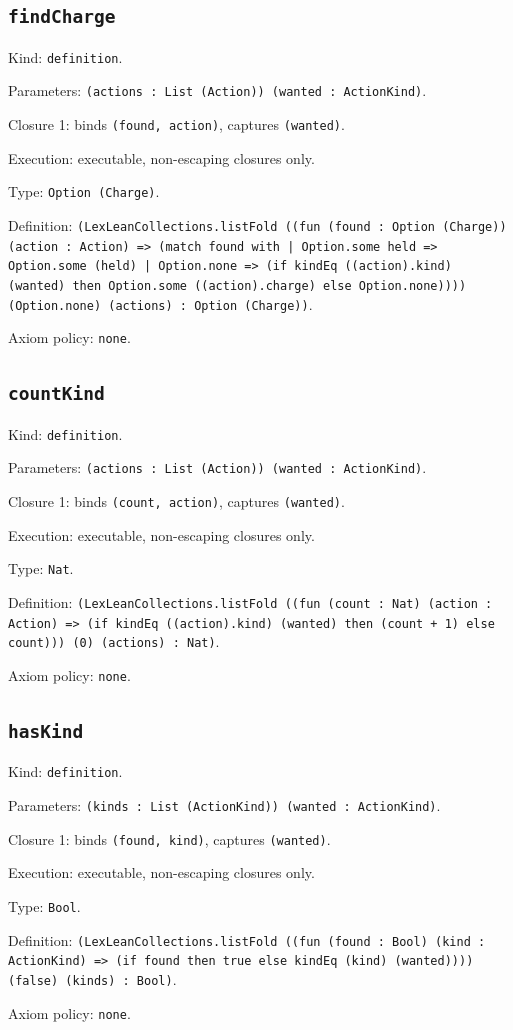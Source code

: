 \documentclass[11pt]{article}
\begin{document}
\subsection*{\texttt{findCharge}}
\noindent Kind: \texttt{definition}.\par
\noindent Parameters: \texttt{(actions : List (Action)) (wanted : ActionKind)}.\par
\noindent Closure 1: binds \texttt{(found, action)}, captures \texttt{(wanted)}.\par
\noindent Execution: executable, non-escaping closures only.\par
\noindent Type: \texttt{Option (Charge)}.\par
\noindent Definition: \texttt{(LexLeanCollections.listFold ((fun (found : Option (Charge)) (action : Action) => (match found with | Option.some held => Option.some (held) | Option.none => (if kindEq ((action).kind) (wanted) then Option.some ((action).charge) else Option.none)))) (Option.none) (actions) : Option (Charge))}.\par
\noindent Axiom policy: \texttt{none}.\par
\subsection*{\texttt{countKind}}
\noindent Kind: \texttt{definition}.\par
\noindent Parameters: \texttt{(actions : List (Action)) (wanted : ActionKind)}.\par
\noindent Closure 1: binds \texttt{(count, action)}, captures \texttt{(wanted)}.\par
\noindent Execution: executable, non-escaping closures only.\par
\noindent Type: \texttt{Nat}.\par
\noindent Definition: \texttt{(LexLeanCollections.listFold ((fun (count : Nat) (action : Action) => (if kindEq ((action).kind) (wanted) then (count + 1) else count))) (0) (actions) : Nat)}.\par
\noindent Axiom policy: \texttt{none}.\par
\subsection*{\texttt{hasKind}}
\noindent Kind: \texttt{definition}.\par
\noindent Parameters: \texttt{(kinds : List (ActionKind)) (wanted : ActionKind)}.\par
\noindent Closure 1: binds \texttt{(found, kind)}, captures \texttt{(wanted)}.\par
\noindent Execution: executable, non-escaping closures only.\par
\noindent Type: \texttt{Bool}.\par
\noindent Definition: \texttt{(LexLeanCollections.listFold ((fun (found : Bool) (kind : ActionKind) => (if found then true else kindEq (kind) (wanted)))) (false) (kinds) : Bool)}.\par
\noindent Axiom policy: \texttt{none}.\par
\end{document}
